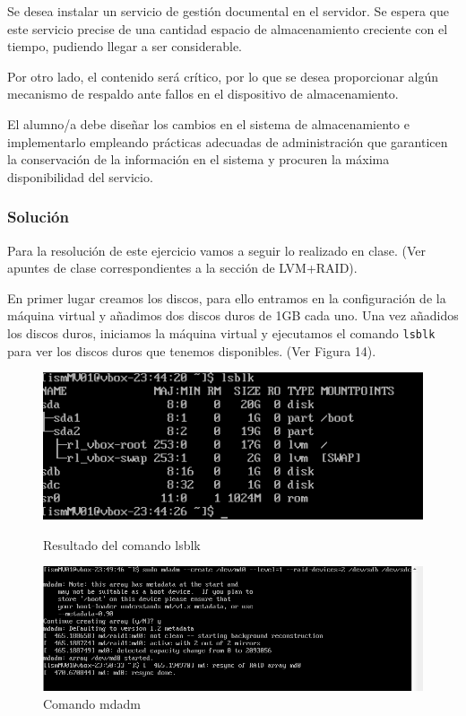 Se desea instalar un servicio de gestión documental en el servidor. Se espera que este servicio
precise de una cantidad espacio de almacenamiento creciente con el tiempo, pudiendo llegar a
ser considerable.

Por otro lado, el contenido será crítico, por lo que se desea proporcionar
algún mecanismo de respaldo ante fallos en el dispositivo de almacenamiento.

El alumno/a debe diseñar los cambios en el sistema de almacenamiento e implementarlo
empleando prácticas adecuadas de administración que garanticen la conservación de la
información en el sistema y procuren la máxima disponibilidad del servicio.

\subsubsection{Solución}

Para la resolución de este ejercicio vamos a seguir lo realizado en clase. (Ver apuntes de clase correspondientes a la sección de LVM+RAID).

En primer lugar creamos los discos, para ello entramos en la configuración de la máquina virtual y añadimos dos discos duros de 1GB cada uno. Una vez añadidos los discos duros, iniciamos la máquina virtual y ejecutamos el comando \texttt{lsblk} para ver los discos duros que tenemos disponibles. (Ver Figura 14).

\begin{figure}[htbp]
  \centering
  \begin{minipage}[b]{0.45\textwidth}
      \centering
      \includegraphics[width=\textwidth]{images/Bloque1/lsblk.png}
      \caption{Resultado del comando lsblk}
  \end{minipage}
  \hfill
  \begin{minipage}[b]{0.45\textwidth}
      \centering
      \includegraphics[width=\textwidth]{images/Bloque1/mdadm.png}
      \caption{Comando mdadm}
  \end{minipage}
\end{figure}


